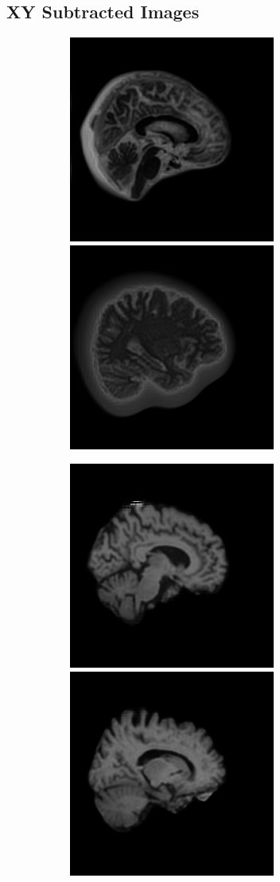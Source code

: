 \documentclass[12pt, fleqn, titlepage]{article}
\newcommand\skipper{1.4pt}
\newcommand\ripper{2.5pt}
\begin{document}
\subsection{XY Subtracted Images}\label{xy_subtracted_images}
\begin{figure}[H]
	\centering
	\begin{subfigure}[b]{0.7\textwidth}
		\centering
		\includegraphics[width=0.30\linewidth]{imgs/1.5T_bilinear}
		\hskip\skipper
		\includegraphics[width=0.30\linewidth]{imgs/3T_bilinear}
	\end{subfigure}
	\vskip\ripper
	\begin{subfigure}[b]{0.7\textwidth}
		\centering
		\includegraphics[width=0.30\linewidth]{imgs/1.5T_no_noise}
		\hskip\skipper
		\includegraphics[width=0.30\linewidth]{imgs/3T_no_noise}
	\end{subfigure}
\end{figure}
\end{document}
